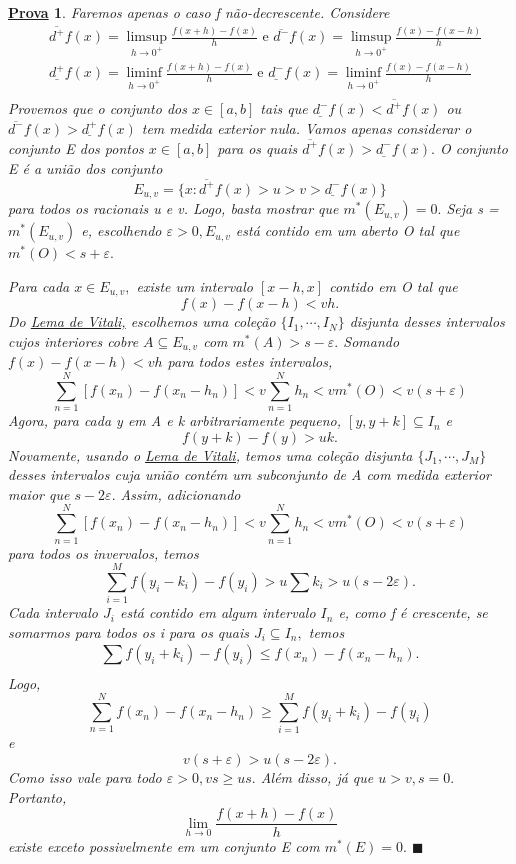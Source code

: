 \documentclass{article}
\newtheorem*{proof*}{\underline{Prova}}
\renewcommand\qedsymbol{$\blacksquare$}
\begin{document}
\begin{proof*}
  Faremos apenas o caso f não-decrescente. Considere 
 \begin{align*}
   &\overline{d^{+}}f(x) = \limsup_{h\to 0^{+}} \frac{f(x+h)-f(x)}{h}\text{ e }\overline{d^{-}}f(x) = \limsup_{h\to 0^{+}}\frac{f(x) - f(x-h)}{h}\\
   &\underline{d^{+}}f(x) = \liminf_{h\to 0^{+}} \frac{f(x+h)-f(x)}{h}\text{ e }\underline{d^{-}}f(x) = \liminf_{h\to 0^{+}}\frac{f(x) - f(x-h)}{h}\\
 \end{align*}
 Provemos que o conjunto dos \(x\in[a, b]\) tais que \(\underline{d^{-}}f(x) < \overline{d^{+}}f(x)\) 
 ou \(\overline{d^{-}}f(x) > \underline{d^{+}}f(x)\) tem medida exterior nula.
 Vamos apenas considerar o conjunto E dos pontos \(x\in[a, b]\) para os quais
 \(\overline{d^{+}}f(x) > \underline{d^{-}}f(x).\) O conjunto E é a união
 dos conjunto 
   \[
   E_{u, v} = \{x: \overline{d^{+}}f(x) > u > v > \underline{d^{-}}f(x) \}
   \]
 para todos os racionais u e v. Logo, basta mostrar que \(m^{*}(E_{u, v}) = 0.\)
Seja s = \(m^{*}(E_{u,v })\) e, escolhendo \(\varepsilon >0, E_{u, v}\) está contido
em um aberto O tal que \(m^{*}(O) < s + \varepsilon .\)

  Para cada \(x\in E_{u, v},\) existe um intervalo \([x-h, x]\) contido em O tal que 
    \[
      f(x) - f(x-h) < vh.
    \]
  Do \hyperlink{vitali_covering}{Lema de Vitali,} escolhemos uma cole\c cão \(\{I_{1}, \cdots, I_{N}\} \)
disjunta desses intervalos cujos interiores cobre \(A\subseteq{E_{u, v}}\) com
 \(m^{*}(A) > s-\varepsilon .\) Somando \(f(x) - f(x-h) < vh\) para todos estes intervalos, 
   \[
     \sum\limits_{n=1}^{N}[f(x_{n}) - f(x_{n}-h_{n})] < v \sum\limits_{n=1}^{N}h_{n} < vm^{*}(O) < v(s+\varepsilon )
   \]
   Agora, para cada y em A e k arbitrariamente pequeno, \([y, y+k]\subseteq{I_{n}}\) e 
     \[
       f(y+k)-f(y) > uk.
     \]
     Novamente, usando o \hyperlink{vitali_covering}{Lema de Vitali,} temos uma cole\c cão
     disjunta \(\{J_{1}, \cdots, J_{M}\}\) desses intervalos cuja união contém um 
    subconjunto de A com medida exterior maior que \(s-2\varepsilon .\) Assim,
    adicionando
   \[
     \sum\limits_{n=1}^{N}[f(x_{n}) - f(x_{n}-h_{n})] < v \sum\limits_{n=1}^{N}h_{n} < vm^{*}(O) < v(s+\varepsilon )
   \]
    para todos os invervalos, temos 
      \[
        \sum\limits_{i=1}^{M}f(y_{i}-k_{i})-f(y_{i}) > u\sum k_{i} > u (s-2\varepsilon ).
      \]
    Cada intervalo \(J_{i}\) está contido em algum intervalo \(I_{n}\) e, como f é
crescente, se somarmos para todos os i para os quais \(J_{i}\subseteq{I_{n}},\) temos 
        \[
          \sum\limits_{}^{}f(y_{i}+k_{i}) - f(y_{i})\leq f(x_{n}) - f(x_{n}-h_{n}).
        \]
    Logo, 
        \[
          \sum\limits_{n=1}^{N}f(x_{n})-f(x_{n}-h_{n})\geq \sum\limits_{i=1}^{M}f(y_{i}+k_{i}) - f(y_{i})
        \]
    e 
        \[
          v(s+\varepsilon ) > u(s-2\varepsilon ).
        \]
    Como isso vale para todo \(\varepsilon >0, vs\geq us.\) Além disso, já que 
    \(u > v, s=0.\) Portanto, 
      \[
        \lim_{h\to 0}\frac{f(x+h)-f(x)}{h}
      \]
    existe exceto possivelmente em um conjunto E com \(m^{*}(E) = 0.\) \qedsymbol
\end{proof*}
\end{document}
